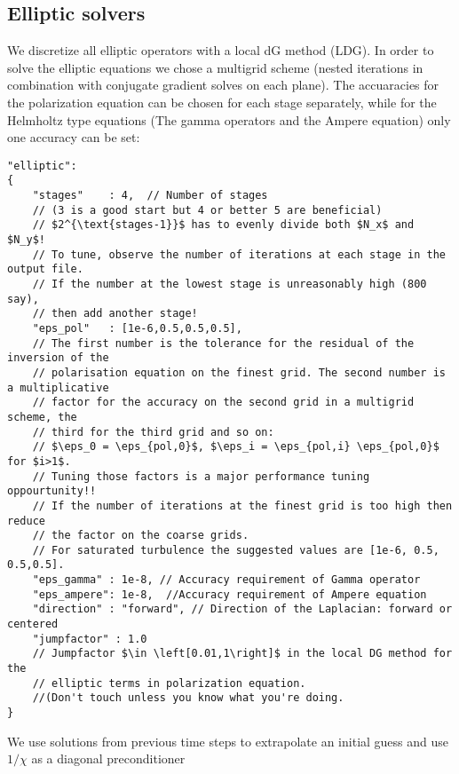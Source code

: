 \subsection{Elliptic solvers}
We discretize all elliptic operators with a local dG method (LDG).  In order to
solve the elliptic equations we chose a multigrid scheme (nested iterations in
combination with conjugate gradient solves on each plane). The accuaracies for
the polarization equation can be chosen for each stage separately, while for
the Helmholtz type equations (The gamma operators and the Ampere equation) only
one accuracy can be set:
\begin{verbatim}
"elliptic":
{
    "stages"    : 4,  // Number of stages
    // (3 is a good start but 4 or better 5 are beneficial)
    // $2^{\text{stages-1}}$ has to evenly divide both $N_x$ and $N_y$!
    // To tune, observe the number of iterations at each stage in the output file.
    // If the number at the lowest stage is unreasonably high (800 say),
    // then add another stage!
    "eps_pol"   : [1e-6,0.5,0.5,0.5],
    // The first number is the tolerance for the residual of the inversion of the
    // polarisation equation on the finest grid. The second number is a multiplicative
    // factor for the accuracy on the second grid in a multigrid scheme, the
    // third for the third grid and so on:
    // $\eps_0 = \eps_{pol,0}$, $\eps_i = \eps_{pol,i} \eps_{pol,0}$  for $i>1$.
    // Tuning those factors is a major performance tuning oppourtunity!!
    // If the number of iterations at the finest grid is too high then reduce
    // the factor on the coarse grids.
    // For saturated turbulence the suggested values are [1e-6, 0.5, 0.5,0.5].
    "eps_gamma" : 1e-8, // Accuracy requirement of Gamma operator
    "eps_ampere": 1e-8,  //Accuracy requirement of Ampere equation
    "direction" : "forward", // Direction of the Laplacian: forward or centered
    "jumpfactor" : 1.0
    // Jumpfactor $\in \left[0.01,1\right]$ in the local DG method for the
    // elliptic terms in polarization equation.
    //(Don't touch unless you know what you're doing.
}
\end{verbatim}
\begin{tcolorbox}[title=Note]
    We use solutions from previous time steps to extrapolate an initial guess
    and use $1/\chi$ as a diagonal preconditioner
\end{tcolorbox}
